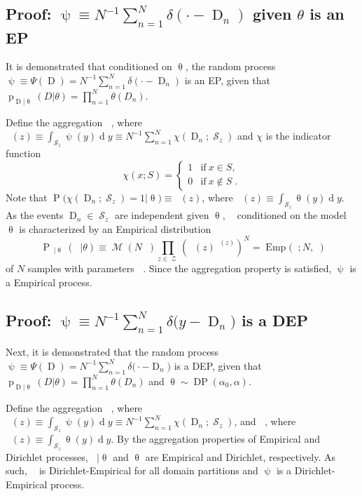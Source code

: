 \documentclass[12pt]{report}
\DeclareMathOperator{\Drm}{\mathrm{D}}
\DeclareMathOperator{\Prm}{\mathrm{P}}
\DeclareMathOperator{\prm}{\mathrm{p}}
\DeclareMathOperator{\drm}{\mathrm{d}}
\DeclareMathOperator{\Zcal}{\mathcal{Z}}
\DeclareMathOperator{\Mcal}{\mathcal{M}}
\DeclareMathOperator{\Scal}{\mathcal{S}}
\DeclareMathOperator{\DP}{\mathrm{DP}}
\DeclareMathOperator{\Emp}{\mathrm{Emp}}
\DeclareMathOperator{\thetam}{\theta_\text{m}}
\DeclareMathOperator{\upthetam}{\uptheta_\text{m}}
\DeclareMathOperator{\psim}{\psi_\text{m}}
\DeclareMathOperator{\uppsim}{\uppsi_\text{m}}
\begin{document}
\subsection{Proof: $\uppsi \equiv N^{-1} \sum_{n=1}^N \delta(\cdot - \Drm_n)$ given $\theta$ is an EP}

It is demonstrated that conditioned on $\uptheta$, the random process $\uppsi \equiv \Psi(\Drm) = N^{-1} \sum_{n=1}^N \delta(\cdot - \Drm_n)$ is an EP, given that $\prm_{\Drm|\uptheta}(D|\theta) = \prod_{n=1}^N \theta(D_n)$.

Define the aggregation $\uppsim$, where $\uppsim(z) \equiv \int_{\Scal_z} \uppsi(y) {\drm}y \equiv N^{-1} \sum_{n=1}^N \chi(\Drm_n;\Scal_z)$ and $\chi$ is the indicator function
\begin{equation}
\chi(x;S) = \begin{cases} 1 & \mathrm{if} \ x \in S, \\ 0 & \mathrm{if} \ x \notin S \;.  \end{cases}
\end{equation}
Note that $\Prm\big( \chi(\Drm_n;\Scal_z) = 1 \big| \uptheta \big) \equiv \upthetam(z)$, where $\upthetam(z) \equiv \int_{\Scal_z} \uptheta(y) {\drm}y$. As the events $\Drm_n \in \Scal_z$ are independent given $\uptheta$, $\uppsim$ conditioned on the model $\uptheta$ is characterized by an Empirical distribution 
\begin{equation}
\Prm_{\uppsim | \uptheta}(\psim | \theta) \equiv \Mcal(N \psim) \prod_{z \in \Zcal} \left( \thetam(z) ^{\psim(z)} \right)^{N} = \Emp\big( \psim; N,\thetam \big)
\end{equation}
of $N$ samples with parameters $\thetam$. Since the aggregation property is satisfied, $\uppsi$ is a Empirical process.



\subsection{Proof: $\uppsi \equiv N^{-1} \sum_{n=1}^N \delta\big( y-\Drm_n \big)$ is a DEP}

Next, it is demonstrated that the random process $\uppsi \equiv \Psi(\Drm) = N^{-1} \sum_{n=1}^N \delta\big( \cdot-\Drm_n \big)$ is a DEP, given that $\prm_{\Drm|\uptheta}(D|\theta) = \prod_{n=1}^N \theta(D_n)$ and $\uptheta \sim \DP(\alpha_0, \alpha)$. 

Define the aggregation $\uppsim$, where $\uppsim(z) \equiv \int_{\Scal_z} \uppsi(y) {\drm}y \equiv N^{-1} \sum_{n=1}^N \chi(\Drm_n;\Scal_z)$, and $\upthetam$, where $\upthetam(z) \equiv \int_{\Scal_z} \uptheta(y) {\drm}y$. By the aggregation properties of Empirical and Dirichlet processes, $\uppsim | \uptheta$ and $\uptheta$ are Empirical and Dirichlet, respectively. As such, $\uppsim$ is Dirichlet-Empirical for all domain partitions and $\uppsi$ is a Dirichlet-Empirical process.
\end{document}
